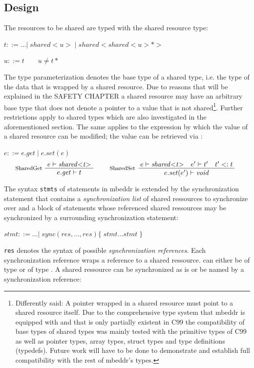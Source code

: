 \subsection{Design}
The resources to be shared are typed with the shared resource type:

$ t ::= ...|\;\mathit{shared{<}u{>}}\;|\;\mathit{shared{<}shared{<}u{>}{*}{>}}\;$

$ u ::= t \qquad u \neq t*$

The type parameterization denotes the base type of a shared type, i.e. the type of the data that is wrapped by a shared resource. Due to reasons that will be explained in the SAFETY CHAPTER a shared resource may have an arbitrary base type that does not denote a pointer to a value that is not shared\footnote{Differently said: A pointer wrapped in a shared resource must point to a shared resource itself. Due to the comprehensive type system that mbeddr is equipped with and that is only partially existent in C99 the compatibility of base types of shared types was mainly tested with the primitive types of C99 as well as pointer types, array types, struct types and type definitions (typedefs). Future work will have to be done to demonstrate and establish full compatibility with the rest of mbeddr's types.}. Further restrictions apply to shared types which are also investigated in the aforementioned section. The same applies to the  expression by which the value of a shared resource can be modified; the value can be retrieved via :

$ e ::= e.\mathit{get}\;|\;e.\mathit{set(e)} $
\begin{align*}
\inference*[SharedGet]{e |- \mathit{shared{<}t{>}}} {\quad e.\mathit{get} |- t \quad}
\qquad
\inference*[SharedSet]{e |- \mathit{shared{<}t{>}} \quad e' |- t' \quad t' <: t} {\qquad\quad e.\mathit{set}(e') |- \mathit{void} \quad\qquad} 
\end{align*}

The syntax \texttt{stmts} of statements in mbeddr is extended by the synchronization statement  that contains a \textit{synchronization list} of shared ressources to synchronize over and a block of statements whose referenced shared ressources may be synchronized by a surrounding synchronization statement:

$ \mathit{stmt} ::= ...
        |\;\mathit{sync}(res, ..., res) \{\;\mathit{stmt} ... \mathit{stmt}\;\}$
        
\texttt{res} denotes the syntax of possible \textit{synchronization references}. Each synchronization reference  wraps a reference  to a shared ressource.  can either be of type  or of type . A shared ressource can be synchronized as is or be named by a synchronization reference:

